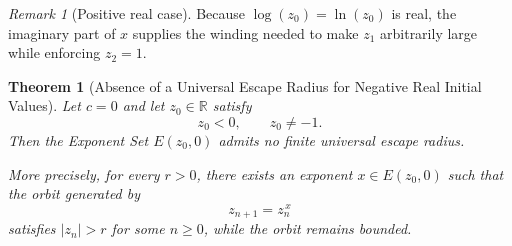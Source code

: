 \documentclass[12pt,a4paper]{amsart}
\newtheorem{theorem}{Theorem}[section]
\theoremstyle{remark}
\newtheorem{remark}{Remark}[section]
\newcommand{\R}{\mathbb{R}}
\begin{document}
\begin{remark}[Positive real case]
Because $\log(z_0)=\ln(z_0)$ is real, the imaginary part of $x$ supplies the
winding needed to make $z_1$ arbitrarily large while enforcing $z_2=1$.
\end{remark}

\medskip

\begin{theorem}[Absence of a Universal Escape Radius for Negative Real Initial Values]
\label{thm:no-universal-radius-negative-real}
Let $c=0$ and let $z_0\in\R$ satisfy
\[
z_0<0,
\qquad
z_0\ne -1.
\]
Then the Exponent Set $E(z_0,0)$ admits no finite universal escape radius.

More precisely, for every $r>0$, there exists an exponent $x\in E(z_0,0)$
such that the orbit generated by
\[
z_{n+1}=z_n^{\,x}
\]
satisfies $|z_n|>r$ for some $n\ge 0$, while the orbit remains bounded.
\end{theorem}
\end{document}
